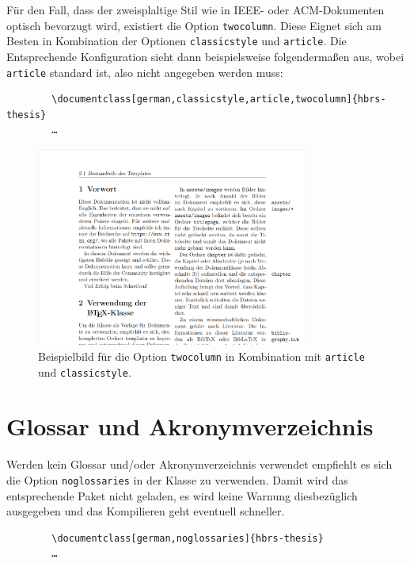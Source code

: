 Für den Fall, dass der zweisplaltige Stil wie in IEEE- oder ACM-Dokumenten optisch bevorzugt wird, existiert die Option \texttt{twocolumn}. Diese Eignet sich am Besten in Kombination der Optionen \texttt{classicstyle} und \texttt{article}. Die Entsprechende Konfiguration sieht dann beispielsweise folgendermaßen aus, wobei \texttt{article} standard ist, also nicht angegeben werden muss:

\begin{cde}
    \begin{verbatim}
        \documentclass[german,classicstyle,article,twocolumn]{hbrs-thesis}
        …
    \end{verbatim}
\end{cde}

\begin{figure}[H]
    \centering
    \includegraphics[width=0.8\textwidth]{assets/images/klassenoptionen/twocolumn_classicstyle_article.png}
    \caption{Beispielbild für die Option \texttt{twocolumn} in Kombination mit \texttt{article} und \texttt{classicstyle}.}
\end{figure}

\section{Glossar und Akronymverzeichnis}
Werden kein Glossar und/oder Akronymverzeichnis verwendet empfiehlt es sich die Option \texttt{noglossaries} in der Klasse zu verwenden. Damit wird das entsprechende Paket nicht geladen, es wird keine Warnung diesbezüglich ausgegeben und das Kompilieren geht eventuell schneller.

\begin{cde}
    \begin{verbatim}
        \documentclass[german,noglossaries]{hbrs-thesis}
        …
    \end{verbatim}
\end{cde}